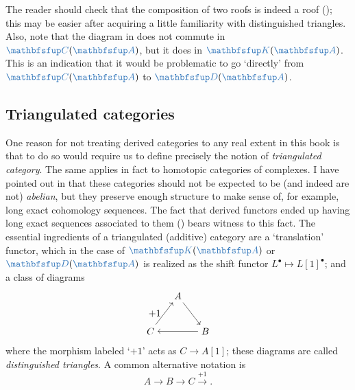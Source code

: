The reader should check that the composition of two roofs is indeed a
roof
();
this may be easier after acquiring a little familiarity with
distinguished triangles. Also, note that the diagram in
 does
not commute in $\categ{C}(\categ{A})$, but it does in
$\categ{K}(\categ{A})$. This is an indication that it would be
problematic to go `directly' from $\categ{C}(\categ{A})$ to
$\categ{D}(\categ{A})$.

\subsection{Triangulated categories}
\label{subsec:homol:triangulated-categories}
One reason for not treating derived categories to any real extent in
this book is that to do so would require us to define precisely the
notion of \emph{triangulated category}. The same applies in fact to
homotopic categories of complexes. I have pointed out in
that these categories should not be expected to be (and indeed are
not) \emph{abelian}, but they preserve enough structure to make sense
of, for example, long exact cohomology sequences. The fact that
derived functors ended up having long exact sequences associated to
them ()
bears witness to this fact.  The essential ingredients of a
triangulated (additive) category are a `translation' functor, which in
the case of $\categ{K}(\categ{A})$ or $\categ{D}(\categ{A})$ is
realized as the shift functor $L^\bullet \mapsto L[1]^\bullet$; and a
class of diagrams
\[
  \begin{tikzpicture}[baseline=(current bounding box.center)]
    \node (A) at (1,1.3) {$A$}; \node (C) at (0,0)
    {$C$}; \node (B) at (2,0)
    {$B$}; \draw[->] (A) -- (B); \draw[->] (B) -- (C); \draw[->] (C)
    -- (A) node[midway, left] {$+1$};
  \end{tikzpicture}
\]
where the morphism labeled `$+1$' acts as $C \to A[1]$; these diagrams
are called \emph{distinguished triangles}. A common alternative
notation is
\[
  A \longrightarrow B \longrightarrow C \xrightarrow{+1}.
\]

